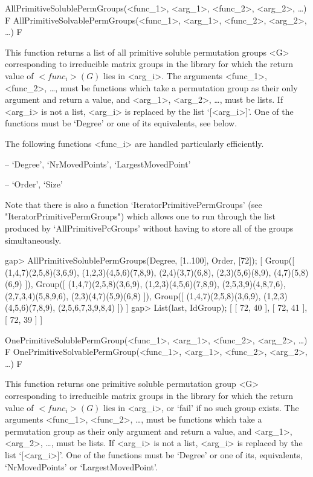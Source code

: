 \>AllPrimitiveSolublePermGroups(<func_1>, <arg_1>, <func_2>, <arg_2>, \dots) F
\>AllPrimitiveSolvablePermGroups(<func_1>, <arg_1>, <func_2>, <arg_2>, \dots) F

This function returns a list of all primitive soluble permutation
groups <G> corresponding to irreducible matrix groups in the  {\IRREDSOL} library 
for which the return value of $<func_i>(G)$ lies
in <arg_i>.  The arguments <func_1>, <func_2>, \dots,
must be {\GAP} functions which take a permutation group as their only argument and return a
value, and <arg_1>, <arg_2>,
\dots,  must be lists. If <arg_i> is not a list, <arg_i> is replaced by the list
`[<arg_i>]'. One of the functions must be `Degree' or one of its
equivalents, see below.

The following functions <func_i> are handled particularly efficiently. 

\beginlist

\item{--} `Degree', `NrMovedPoints', `LargestMovedPoint'
\item{--} `Order', `Size'
\endlist

Note that there is also a function `IteratorPrimitivePermGroups' (see
"IteratorPrimitivePermGroups") which allows one to run through the list produced by
`AllPrimitivePcGroups' without having to store all of the groups
simultaneously.

\beginexample
gap> AllPrimitiveSolublePermGroups(Degree, [1..100], Order, [72]);
[ Group([ (1,4,7)(2,5,8)(3,6,9), (1,2,3)(4,5,6)(7,8,9), (2,4)(3,7)(6,8), 
      (2,3)(5,6)(8,9), (4,7)(5,8)(6,9) ]), 
  Group([ (1,4,7)(2,5,8)(3,6,9), (1,2,3)(4,5,6)(7,8,9), (2,5,3,9)(4,8,7,6), 
      (2,7,3,4)(5,8,9,6), (2,3)(4,7)(5,9)(6,8) ]), 
  Group([ (1,4,7)(2,5,8)(3,6,9), (1,2,3)(4,5,6)(7,8,9), (2,5,6,7,3,9,8,4) ]) ]
gap> List(last, IdGroup);
[ [ 72, 40 ], [ 72, 41 ], [ 72, 39 ] ]
\endexample


\>OnePrimitiveSolublePermGroup(<func_1>, <arg_1>, <func_2>, <arg_2>, \dots) F
\>OnePrimitiveSolvablePermGroup(<func_1>, <arg_1>, <func_2>, <arg_2>, \dots) F

This function returns one primitive soluble permutation
group <G> corresponding to irreducible matrix groups in the  {\IRREDSOL} library 
for which the return value of $<func_i>(G)$ lies in
<arg_i>, or `fail' if no such group exists.  The arguments <func_1>, <func_2>, \dots,
must be {\GAP} functions which take a permutation group as their only argument and return a
value, and <arg_1>, <arg_2>,
\dots,  must be lists. If <arg_i> is not a list, <arg_i> is replaced by the list
`[<arg_i>]'. One of the functions must be `Degree' or one of its, equivalents, `NrMovedPoints' or `LargestMovedPoint'.

